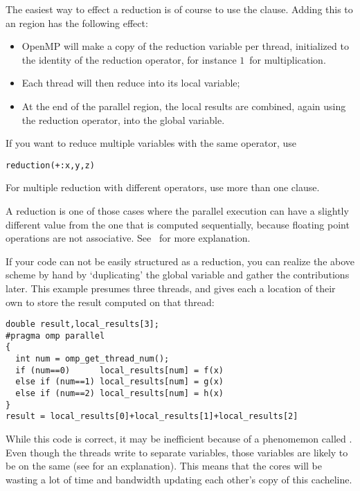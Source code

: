 The easiest way to effect a reduction is of course to use the 
clause.
Adding this to an  region
has the following effect:
\begin{itemize}
\item OpenMP will make a copy of the reduction variable per thread,
  initialized to the identity of the reduction operator, for instance
  $1$~for multiplication.
\item Each thread will then reduce into its local variable;
\item At the end of the parallel region, the local results are combined, again
  using the reduction operator, into the global variable.
\end{itemize}

If you want to reduce multiple variables with the same operator, use
\begin{lstlisting}
reduction(+:x,y,z)
\end{lstlisting}
For multiple reduction with different operators, use more than one clause.

A reduction is one of those cases where the parallel execution can have a slightly different
value from the one that is computed sequentially, because floating point operations
are not associative. See~ for more explanation.

If your code can not be easily structured as a reduction, you can 
realize the above scheme by hand by
`duplicating' the global variable and gather the contributions later.
This example presumes three threads, and gives each a location of their
own to store the result computed on that thread:
\begin{lstlisting}
double result,local_results[3];
#pragma omp parallel
{
  int num = omp_get_thread_num();
  if (num==0)      local_results[num] = f(x)
  else if (num==1) local_results[num] = g(x)
  else if (num==2) local_results[num] = h(x)
}
result = local_results[0]+local_results[1]+local_results[2]
\end{lstlisting}
While this code is correct, it may be inefficient because of a
phenomemon called . Even though the threads write
to separate variables, those variables are likely to be on the same 
 (see  for an explanation).
This means that the cores will be wasting a lot of time and bandwidth updating
each other's copy of this cacheline.

